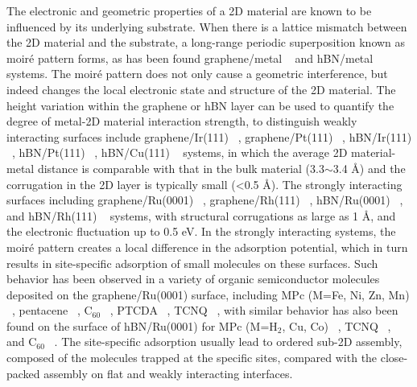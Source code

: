 The electronic and geometric properties of a 2D material are known to be
influenced by its underlying substrate. When there is a lattice
mismatch between the 2D material and the substrate, a long-range
periodic superposition known as moiré pattern forms, as has been
found graphene/metal ~\cite{Hamalainen_2013_moire_gr} and hBN/metal
~\cite{Schulz_2014_hBN_moire} systems.  The
moiré pattern does not only cause a geometric interference, but
indeed changes the local electronic state and structure of the 2D
material.
%
The height variation within the graphene or hBN layer can be used to
quantify the degree of metal-2D material interaction strength, to
distinguish weakly interacting surfaces include graphene/Ir(111)
~\cite{Pletikosi_2009_gr_Ir,Busse_2011_Gr_Ir,Hamalainen_2013_moire_gr},
graphene/Pt(111) ~\cite{Sutter_2009_Gr_Pt}, hBN/Ir(111)
~\cite{Schulz_2014_hBN_moire}, hBN/Pt(111) ~\cite{Cavar_2008_hBN_Pt},
hBN/Cu(111) ~\cite{Joshi_2012_hBN_Cu} systems, in which the average 2D
material-metal distance is comparable with that in the bulk material
(3.3$\sim{}$3.4 \AA{}) and the corrugation in the 2D layer is
typically small (<0.5 \AA{}). The strongly interacting surfaces
including graphene/\allowbreak{}Ru(0001)
~\cite{Moritz_2010_gr_Ru,Sutter_2008_gr_Ru}, graphene/Rh(111)
~\cite{Wang_2010_gr_Rh}, hBN/Ru(0001) ~\cite{Wang_2010_gr_Rh}, and
hBN/Rh(111) ~\cite{Dil_2008_hBN_Rh} systems, with structural
corrugations as large as 1 \AA{}, and the electronic fluctuation up to
0.5 eV. In the strongly interacting systems, the moiré pattern creates
a local difference in the adsorption potential, which in turn results
in site-specific adsorption of small molecules on these surfaces. Such
behavior has been observed in a variety of organic semiconductor
molecules deposited on the graphene/\allowbreak{}Ru(0001) surface,
including MPc (M=Fe, Ni, Zn, Mn)
~\cite{Mao_2009_Pc_gr_kagome,Zhang_2011_FePc_gr}, pentacene
~\cite{Zhou_2013_penta_gr_Ru}, C\(_{\text{60}}\)
~\cite{Li_2012_c60_gr_Ru}, PTCDA ~\cite{Zhou_2011_PTCDA_gr_Ru}, TCNQ
~\cite{Maccariello_2014_TCNQ_gr_Ru}, with similar behavior has also
been found on the surface of hBN/Ru(0001) for MPc (M=H\(_{\text{2}}\),
Cu, Co) ~\cite{Dil_2008_hBN_Rh,Jarvinen_2014_MPc_hBN_Ru}, TCNQ
~\cite{Joshi_2014_TCNQ_hBN}, and C\(_{\text{60}}\)
~\cite{Corso_2004_C60_hBN}. The site-specific adsorption usually lead
to ordered sub-2D assembly, composed of the molecules trapped at the
specific sites, compared with the close-packed assembly on flat and
weakly interacting interfaces.


